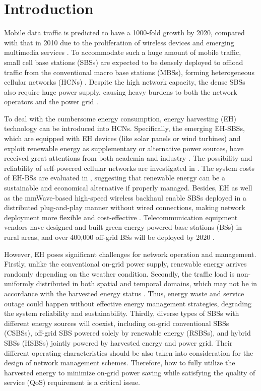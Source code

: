 \documentclass[12pt, draftclsnofoot,onecolumn]{IEEEtran}
\begin{document}
\section{Introduction}


Mobile data traffic is predicted to have a 1000-fold growth by 2020, compared with that in 2010 due to the proliferation of wireless devices and emerging multimedia services \cite{Qualcomm}. To accommodate such a huge amount of mobile traffic, small cell base stations (SBSs) are expected to be densely deployed
to offload traffic from the conventional macro base stations (MBSs), forming heterogeneous cellular networks (HCNs) \cite{NZhang_cloud_5G}.
Despite the high network capacity, the dense SBSs also require huge power supply, causing heavy burdens to both the network operators and the power grid \cite{Ismail14_green_survey_Zhuang}.

To deal with the cumbersome energy consumption, energy harvesting (EH) technology can be introduced into HCNs.
Specifically, the emerging EH-SBSs, which are equipped with EH devices (like solar panels or wind turbines) and exploit renewable energy as supplementary or alternative power sources, have received great attentions from both academia and industry \cite{JSAC_overview_5G}.
The possibility and reliability of self-powered cellular networks are investigated in \cite{Jeffery_fundamental}.
The system costs of EH-BSs are evaluated in \cite{green_cellular_cost}, suggesting that renewable energy can be a sustainable and economical alternative if properly managed.
Besides, EH as well as the mmWave-based high-speed wireless backhaul enable SBSs deployed in a distributed plug-and-play manner without wired connections, making network deployment more flexible and cost-effective \cite{Jeffery_fundamental}.
Telecommunication equipment vendors have designed and built green energy powered base stations (BSs) in rural areas, and over 400,000 off-grid BSs will be deployed by 2020 \cite{Navigant_report}.

However, EH poses significant challenges for network operation and management.
Firstly, unlike the conventional on-grid power supply, renewable energy arrives randomly depending on the weather condition.
Secondly, the traffic load is non-uniformly distributed in both spatial and temporal domains, which may not be in accordance with the harvested energy status \cite{Tao_Magazine_RE} \cite{Zhongming}.
Thus, energy waste and service outage could happen without effective energy management strategies, degrading the system reliability and sustainability.
Thirdly, diverse types of SBSs with different energy sources will coexist, including on-grid conventional SBSs (CSBSs), off-grid SBS powered solely by renewable energy (RSBSs), and hybrid SBSs (HSBSs) jointly powered by harvested energy and power grid.
Their different operating characteristics should be also taken into consideration for the design of network management schemes.
Therefore, how to fully utilize the harvested energy to minimize on-grid power saving while satisfying the quality of service (QoS) requirement is a critical issue.
\end{document}
